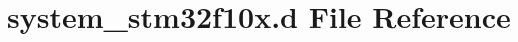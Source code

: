 \hypertarget{system__stm32f10x_8d}{}\section{system\+\_\+stm32f10x.\+d File Reference}
\label{system__stm32f10x_8d}
